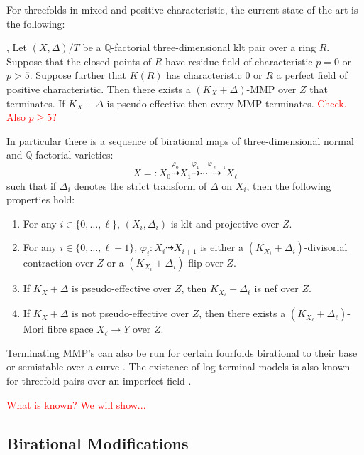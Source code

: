 \documentclass[a4paper,12pt]{book}
\newcommand\myworries[1]{\textcolor{red}{#1}}
\begin{document}
For threefolds in mixed and positive characteristic, the current state of the art is the following:

	\begin{theorem}\cite[Theorem 1.7]{BW17}, \cite[Theorem 1.2]{BW17}\cite[Theorem F]{bhatt2020}\label{MMP}
	Let $(X, \Delta)/T$ be a $\mathbb{Q}$-factorial three-dimensional klt pair over a ring $R$. Suppose that the closed points of $R$ have residue field of characteristic $p=0$ or $p> 5$. Suppose further that $K(R)$ has characteristic $0$ or $R$ a perfect field of positive characteristic. Then there exists a $(K_X+\Delta)$-MMP over $Z$ that terminates. If $K_{X}+\Delta$ is pseudo-effective then every MMP terminates. \myworries{Check. Also $p \geq 5?$}
	
	In particular there is a sequence of birational maps of three-dimensional normal and $\mathbb{Q}$-factorial varieties:  
	\[
	X=:X_0 \overset{\varphi_0}{\dashrightarrow} X_1 \overset{\varphi_1}{\dashrightarrow} \cdots \overset{\varphi_{\ell-1}}{\dashrightarrow} X_{\ell}
	\]
	such that if $\Delta_i$ denotes the strict transform of $\Delta$ on $X_i$, then
	the following properties hold:  
	\begin{enumerate}
		\item 
		For any $i \in \{0, \ldots, \ell\}$, 
		$(X_i, \Delta_i)$ is klt and projective over $Z$.
		\item 
		For any $i \in \{0, \ldots, \ell-1\}$, 
		$\varphi_i\colon X_i \dashrightarrow X_{i+1}$ is either a $(K_{X_i}+\Delta_i)$-divisorial contraction over $Z$ or a $(K_{X_i}+\Delta_i)$-flip over $Z$. 
		\item 
		If $K_X+\Delta$ is pseudo-effective over $Z$, then $K_{X_{\ell}}+\Delta_{\ell}$ is nef over $Z$. 
		\item 
		If $K_X+\Delta$ is not pseudo-effective over $Z$, then 
		there exists a $(K_{X_{\ell}}+\Delta_{\ell})$-Mori fibre space $X_{\ell} \to Y$ over $Z$. 
	\end{enumerate}
\end{theorem}

Terminating MMP's can also be run for certain fourfolds birational to their base or semistable over a curve \cite{}. The existence of log terminal models is also known for threefold pairs over an imperfect field \cite{}. 

\myworries{What is known? We will show...}


\subsection{Birational Modifications}
\end{document}
